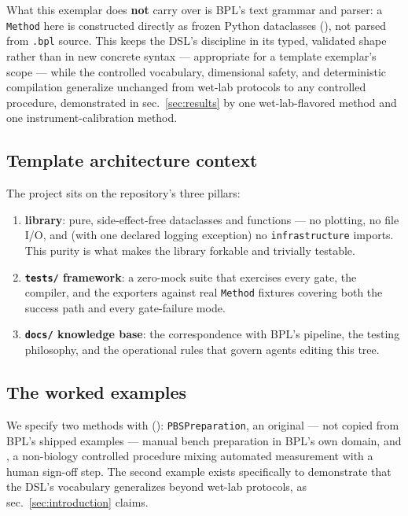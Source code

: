 \documentclass[
  english,
]{article}
\providecommand{\tightlist}{%
  \setlength{\itemsep}{0pt}\setlength{\parskip}{0pt}}
\begin{document}
What this exemplar does \textbf{not} carry over is BPL's text grammar
and parser: a \texttt{Method} here is constructed directly as frozen
Python dataclasses (), not parsed from
\texttt{.bpl} source. This keeps the DSL's discipline in its typed,
validated shape rather than in new concrete syntax --- appropriate for a
template exemplar's scope --- while the controlled vocabulary,
dimensional safety, and deterministic compilation generalize unchanged
from wet-lab protocols to any controlled procedure, demonstrated in
sec.~\ref{sec:results} by one wet-lab-flavored method and one
instrument-calibration method.

\subsection{Template architecture
context}\label{template-architecture-context}

The project sits on the repository's three pillars:

\begin{enumerate}
\def\labelenumi{\arabic{enumi}.}
\tightlist
\item
  \textbf{ library}: pure, side-effect-free
  dataclasses and functions --- no plotting, no file I/O, and (with one
  declared logging exception) no \texttt{infrastructure} imports. This
  purity is what makes the library forkable and trivially testable.
\item
  \textbf{\texttt{tests/} framework}: a zero-mock suite that exercises
  every gate, the compiler, and the exporters against real
  \texttt{Method} fixtures covering both the success path and every
  gate-failure mode.
\item
  \textbf{\texttt{docs/} knowledge base}: the correspondence with BPL's
  pipeline, the testing philosophy, and the operational rules that
  govern agents editing this tree.
\end{enumerate}

\subsection{The worked examples}\label{the-worked-examples}

We specify two methods with 
():
\texttt{PBSPreparation}, an original --- not copied from BPL's shipped
examples --- manual bench preparation in BPL's own domain, and
, a non-biology controlled procedure
mixing automated measurement with a human sign-off step. The second
example exists specifically to demonstrate that the DSL's vocabulary
generalizes beyond wet-lab protocols, as sec.~\ref{sec:introduction}
claims.
\end{document}
